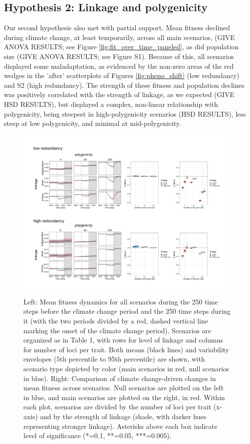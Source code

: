 \documentclass[9pt,twocolumn,twoside,lineno]{pnas-new}
\begin{document}
\subsection{Hypothesis 2: Linkage and polygenicity}
Our second hypothesis also met with partial support.
Mean fitness declined during climate change, at least temporarily, across all main scenarios, (GIVE ANOVA 
RESULTS; see Figure \ref{fig:fit_over_time_paneled}, as did population size (GIVE ANOVA 
RESULTS; see Figure S1).
Because of this, all scenarios displayed some maladaptation, as evidenced by the non-zero areas of the red wedges
in the 'after' scatterplots of Figures \ref{fig:pheno_shift} (low redundancy) and S2 (high redundancy).
The strength of these fitness and population declines was 
positively correlated with the strength of linkage, as we expected (GIVE HSD RESULTS),
but displayed a complex, non-linear relationship with polygenicity,
being steepest in high-polygenicity
scenarios (HSD RESULTS), less steep at low polygenicity, and minimal at
mid-polygenicity. 

\begin{figure}[\sidecaptionrelwidth][t]
\centering
\includegraphics[width=17.8cm]{fit_time_series_and_boxplots.jpg}
\caption{Left: Mean fitness dynamics for all scenarios during the 250 time steps before the climate change period and the 250 time steps during it (with the two periods divided by a red, dashed vertical line marking the onset of the climate change period). Scenarios are organized as in Table 1, with rows for level of linkage and columns for number of loci per trait. Both means (black lines) and variability envelopes (5th percentile to 95th percentile) are shown, with scenario type depicted by color (main scenarios in red, null scenarios in blue). Right: Comparison of climate change-driven changes in mean fitness across scenarios. Null scenarios are plotted on the left in blue, and main scenarios are plotted on the right, in red. Within each plot, scenarios are divided by the number of loci per trait (x-axis) and by the strength of linkage (shade, with darker hues representing stronger linkage). Asterisks above each box indicate level of significance (*=0.1, **=0.05, ***=0.005).}
\label{fig:fit_over_time_and_boxplots}
\end{figure}
\end{document}

